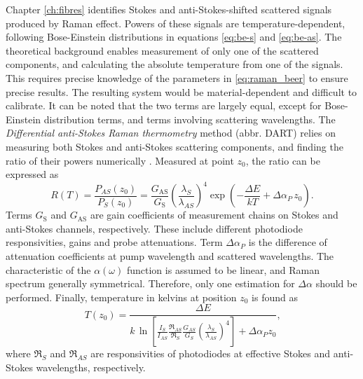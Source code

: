 \documentclass{standalone}
\begin{document}
Chapter \ref{ch:fibres} identifies Stokes and anti-Stokes-shifted scattered signals produced by Raman effect. Powers of these signals are temperature-dependent, following Bose-Einstein distributions in equations \ref{eq:be-s} and \ref{eq:be-as}. The theoretical background enables measurement of only one of the scattered components, and calculating the absolute temperature from one of the signals. This requires precise knowledge of the parameters in \ref{eq:raman_beer} to ensure precise results. The resulting system would be material-dependent and difficult to calibrate. It can be noted that the two terms are largely equal, except for Bose-Einstein distribution terms, and terms involving scattering wavelengths. The \textit{Differential anti-Stokes Raman thermometry} method (abbr. DART) relies on measuring both Stokes and anti-Stokes scattering components, and finding the ratio of their powers numerically \cite{novelMethod2010}. Measured at point $z_0$, the ratio can be expressed as
\begin{equation}
R(T) = \frac{P_{AS}(z_0)}{P_S(z_0)} = \frac{G_\textrm{AS}}{G_\textrm{S}} \left( \frac{\lambda_S}{\lambda_{AS}} \right)^4 \exp\left( - \frac{\varDelta E}{k T} + \varDelta \alpha_P \, z_0 \right) \textrm{.}
\end{equation}
Terms $G_\textrm{S}$ and $G_\textrm{AS}$ are gain coefficients of measurement chains on Stokes and anti-Stokes channels, respectively. These include different photodiode responsivities, gains and probe attenuations. Term $\varDelta \alpha_P$ is the difference of attenuation coefficients at pump wavelength and scattered wavelengths. The characteristic of the $\alpha(\omega)$ function is assumed to be linear, and Raman spectrum generally symmetrical. Therefore, only one estimation for $\varDelta \alpha$ should be performed. Finally, temperature in kelvins at position $z_0$ is found as
\begin{equation} \label{eq:stokes_temperature}
T(z_0) = \frac{\varDelta E}{k \, \ln \left[ \frac{I_S}{I_{AS}} \frac{\Re_{AS}}{\Re_S} \frac{G_{AS}}{G_S} \left(\frac{\lambda_S}{\lambda_{AS}}\right)^4 \right] + \varDelta \alpha_P z_0 } \textrm{,}
\end{equation}
where $\Re_S$ and $\Re_{AS}$ are responsivities of photodiodes at effective Stokes and anti-Stokes wavelengths, respectively.



\setcounter{stranica}{\thepage}
\addtocounter{stranica}{1}
\end{document}
